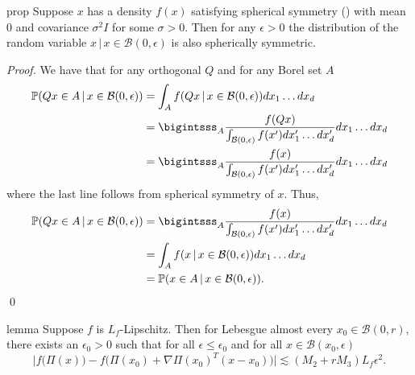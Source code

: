 \documentclass[11pt]{article}
\begin{document}
\begin{restatable}{prop}{} \label{prop: conditional spherical symmetry}
    Suppose $x$ has a density $f(x)$ satisfying spherical symmetry () with mean $0$ and covariance $\sigma^2I$ for some $\sigma > 0$. Then for any $\epsilon > 0$ the distribution of the random variable $x \,| \, x \in \mathcal{B}(0, \epsilon)$ is also spherically symmetric. 
\end{restatable}
\noindent \textit{Proof.} We have that for any orthogonal $Q$ and for any Borel set $A$
\begin{align*}
    \mathbb{P}(Qx \in A \, | \, x \in \mathcal{B}(0,\epsilon) ) &= \int_{A}f(Qx\,|\,x \in \mathcal{B}(0,\epsilon))dx_1\dots dx_d \\
    &= \bigintsss_{A}\frac{f(Qx) }{\int_{\mathcal{B}(0,\epsilon)}f(x')dx'_1 \dots dx'_d}dx_1\dots dx_d \\
    &= \bigintsss_{A}\frac{f(x) }{\int_{\mathcal{B}(0,\epsilon)}f(x')dx'_1 \dots dx'_d}dx_1\dots dx_d
\end{align*}
where the last line follows from spherical symmetry of $x$. Thus,
\begin{align*}
    \mathbb{P}(Qx \in A \, | \, x \in \mathcal{B}(0,\epsilon) ) &= \bigintsss_{A}\frac{f(x) }{\int_{\mathcal{B}(0,\epsilon)}f(x')dx'_1 \dots dx'_d}dx_1\dots dx_d \\
    &= \int_{A}f(x\,|\,x \in \mathcal{B}(0,\epsilon))dx_1\dots dx_d \\
    &= \mathbb{P}(x \in A \, | \, x \in \mathcal{B}(0,\epsilon) ).
\end{align*}
\qed{}

\begin{restatable}[Approximation]{lemma}{} \label{lemma: proj approx}
    Suppose $f$ is $L_f$-Lipschitz. Then for Lebesgue almost every $x_0 \in \mathcal{B}(0,r)$, there exists an $\epsilon_0 > 0$ such that for all $\epsilon \leq \epsilon_0$ and for all $x \in \mathcal{B}(x_0, \epsilon)$
    \[\bigg|f\big(\Pi(x)\big) - f\big(\Pi(x_0) + \nabla\Pi(x_0)^{T}(x-x_0) \big)\bigg| \lesssim (M_2+rM_3)L_f\epsilon^2. \]
\end{restatable}
\end{document}
